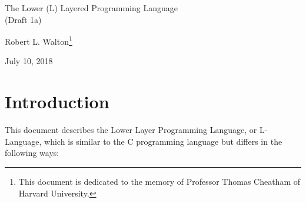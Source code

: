 \documentclass[12pt]{article}
\makeatletter
\renewcommand\tableofcontents{%
    \begin{list}{}%
	     {\setlength{\itemsep}{0in}%
	      \setlength{\topsep}{0in}%
	      \setlength{\parsep}{1ex}%
	      \setlength{\labelwidth}{0in}%
	      \setlength{\baselineskip}{1.5ex}%
	      \setlength{\leftmargin}{1.0in}%
	      \setlength{\rightmargin}{1.0in}}%
    \item\@starttoc{toc}%
    \end{list}}
\makeatother
\begin{document}
        
\begin{center}

{\Large
The Lower (L) Layered Programming Language \\[0.5ex]
(Draft 1a)}

\medskip

Robert L. Walton\footnote{This document is dedicated to the memory
of Professor Thomas Cheatham of Harvard University.}

July 10, 2018
 
\end{center}

{\small \tableofcontents}

\newpage

\section{Introduction}

This document describes the Lower Layer Programming Language, or
L-Language, which is similar to the C programming language
but differs in the following ways:
\end{document}
